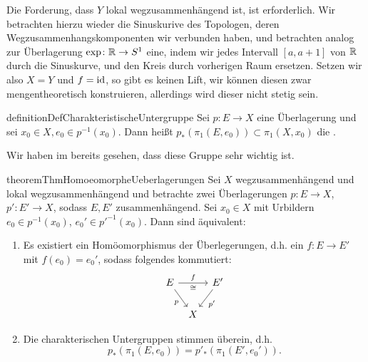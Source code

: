 \begin{example}
    Die Forderung, dass $Y$ lokal wegzusammenhängend ist, ist erforderlich. Wir betrachten hierzu wieder die Sinuskurive des Topologen, deren Wegzusammenhangskomponenten wir verbunden haben, und betrachten analog zur Überlagerung  $\exp \colon  \mathbb{R} \to  S^1$ eine, indem wir jedes Intervall $[a,a+1]$ von  $\mathbb{R}$ durch die Sinuskurve, und den Kreis durch vorherigen Raum ersetzen.
    Setzen wir also $X = Y$ und  $f = \operatorname{id}$, so gibt es keinen Lift, wir können diesen zwar mengentheoretisch konstruieren, allerdings wird dieser nicht stetig sein.
\end{example}

\begin{restatable}{definition}{DefCharakteristischeUntergruppe}\label{def:charakteristische-untegruppe}
    Sei $p\colon  E \to  X$ eine Überlagerung und sei $x_0\in X, e_0\in p^{-1} (x_0)$. Dann heißt $p_*(\pi_1(E,e_0))\subset \pi_1(X,x_0)$ die . 
\end{restatable}

\begin{oral}
    Wir haben im  bereits gesehen, dass diese Gruppe sehr wichtig ist.
\end{oral}

\begin{restatable}{theorem}{ThmHomoeomorpheUeberlagerungen}\label{thm:äquivalenz-von-überlagerungen-über-lokal-wegzsuammenhängendem-wegzusammenhängendem-raum}
    Sei $X$ wegzusammenhängend und lokal wegzusammenhängend und betrachte zwei Überlagerungen $p\colon  E\to X$, $p' \colon  E' \to  X$, sodass $E,E'$ zusammenhängend. Sei  $x_0\in X$ mit Urbildern $e_0\in p^{-1} (x_0)$, $e_0' \in p'^{-1} (x_0)$. Dann sind äquivalent:
    \begin{enumerate}[1)]
        \item Es existiert ein Homöomorphismus der Überlegerungen, d.h. ein $f\colon  E \to  E'$ mit $f(e_0) = e_0'$, sodass folgendes kommutiert:
            \[
                \begin{tikzcd}[column sep = tiny, ampersand replacement = \&]
                E \ar{rr}{f}[swap]{\cong} \ar[swap]{dr}{p} \& \& E' \ar{dl}{p'} \\
            \& X
            \end{tikzcd}
            \]
        \item Die charakterischen Untergruppen stimmen überein, d.h.
            \[
                p_*(\pi_1(E,e_0)) = p'_*(\pi_1(E',e_0'))
            .\] 
    \end{enumerate}
\end{restatable}


